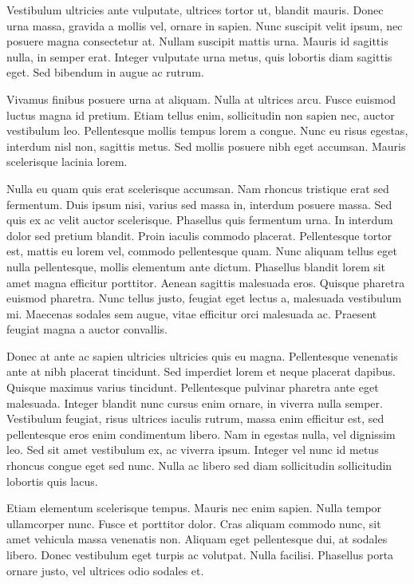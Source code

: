 Vestibulum ultricies ante vulputate, ultrices tortor ut, blandit mauris. Donec urna massa, gravida a mollis vel, ornare in sapien. Nunc suscipit velit ipsum, nec posuere magna consectetur at. Nullam suscipit mattis urna. Mauris id sagittis nulla, in semper erat. Integer vulputate urna metus, quis lobortis diam sagittis eget. Sed bibendum in augue ac rutrum.

Vivamus finibus posuere urna at aliquam. Nulla at ultrices arcu. Fusce euismod luctus magna id pretium. Etiam tellus enim, sollicitudin non sapien nec, auctor vestibulum leo. Pellentesque mollis tempus lorem a congue. Nunc eu risus egestas, interdum nisl non, sagittis metus. Sed mollis posuere nibh eget accumsan. Mauris scelerisque lacinia lorem.

Nulla eu quam quis erat scelerisque accumsan. Nam rhoncus tristique erat sed fermentum. Duis ipsum nisi, varius sed massa in, interdum posuere massa. Sed quis ex ac velit auctor scelerisque. Phasellus quis fermentum urna. In interdum dolor sed pretium blandit. Proin iaculis commodo placerat. Pellentesque tortor est, mattis eu lorem vel, commodo pellentesque quam. Nunc aliquam tellus eget nulla pellentesque, mollis elementum ante dictum. Phasellus blandit lorem sit amet magna efficitur porttitor. Aenean sagittis malesuada eros. Quisque pharetra euismod pharetra. Nunc tellus justo, feugiat eget lectus a, malesuada vestibulum mi. Maecenas sodales sem augue, vitae efficitur orci malesuada ac. Praesent feugiat magna a auctor convallis.

Donec at ante ac sapien ultricies ultricies quis eu magna. Pellentesque venenatis ante at nibh placerat tincidunt. Sed imperdiet lorem et neque placerat dapibus. Quisque maximus varius tincidunt. Pellentesque pulvinar pharetra ante eget malesuada. Integer blandit nunc cursus enim ornare, in viverra nulla semper. Vestibulum feugiat, risus ultrices iaculis rutrum, massa enim efficitur est, sed pellentesque eros enim condimentum libero. Nam in egestas nulla, vel dignissim leo. Sed sit amet vestibulum ex, ac viverra ipsum. Integer vel nunc id metus rhoncus congue eget sed nunc. Nulla ac libero sed diam sollicitudin sollicitudin lobortis quis lacus.

Etiam elementum scelerisque tempus. Mauris nec enim sapien. Nulla tempor ullamcorper nunc. Fusce et porttitor dolor. Cras aliquam commodo nunc, sit amet vehicula massa venenatis non. Aliquam eget pellentesque dui, at sodales libero. Donec vestibulum eget turpis ac volutpat. Nulla facilisi. Phasellus porta ornare justo, vel ultrices odio sodales et.

